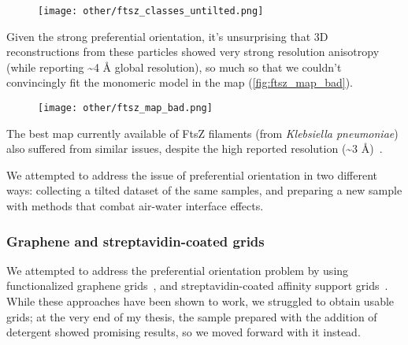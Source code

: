 \begin{figure}
    \centering
    \texttt{[image: other/ftsz\_classes\_untilted.png]}
    \label{fig:ftsz_classes}
\end{figure}

Given the strong preferential orientation, it's unsurprising that 3D reconstructions from these particles showed very strong resolution anisotropy (while reporting \sim4 Å global resolution), so much so that we couldn't convincingly fit the monomeric model in the map (\autoref{fig:ftsz_map_bad}).

\begin{figure}
    \centering
    \texttt{[image: other/ftsz\_map\_bad.png]}
    \label{fig:ftsz_map_bad}
\end{figure}

The best map currently available of FtsZ filaments (from \textit{Klebsiella pneumoniae}) also suffered from similar issues, despite the high reported resolution (\sim3 Å)~\cite{fujitaStructuresFtsZSingle2023}.

We attempted to address the issue of preferential orientation in two different ways: collecting a tilted dataset of the same samples, and preparing a new sample with methods that combat air-water interface effects.

\subsubsection{Graphene and streptavidin-coated grids}

We attempted to address the preferential orientation problem by using functionalized graphene grids~\cite{luFunctionalizedGrapheneGrids2022}, and streptavidin-coated affinity support grids~\cite{crucifixImmobilizationBiotinylatedDNA2004,hanLongShelflifeStreptavidin2016}.
While these approaches have been shown to work, we struggled to obtain usable grids; at the very end of my thesis, the sample prepared with the addition of detergent showed promising results, so we moved forward with it instead.

